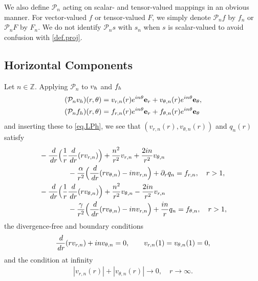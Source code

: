 \documentclass[11pt,a4paper]{article}
\numberwithin{equation}{section}
\newcommand{\Z}{\mathbb{Z}}
\newcommand{\dd}{\,{\rm d}}
\newcommand{\h}{{\rm h}}
\begin{document}
We also define ${\mathcal P}_n$ acting on scalar- and tensor-valued mappings in an obvious manner. For vector-valued $f$ or tensor-valued $F$, we simply denote ${\mathcal P}_n f$ by $f_n$ or ${\mathcal P}_n F$ by $F_n$. We do not identify ${\mathcal P}_n s$ with $s_n$ when $s$ is scalar-valued to avoid confusion with \eqref{def.proj}. 


\subsection{Horizontal Components}
\label{subsec.horiz}


Let $n\in\Z$. Applying ${\mathcal P}_n$ to $v_\h$ and $f_\h$
%
\begin{align*}
({\mathcal P}_n v_\h)(r,\theta)
&= v_{r,n}(r) e^{in\theta} {\bf e}_r 
+ v_{\theta,n}(r) e^{in\theta} {\bf e}_\theta, \\
({\mathcal P}_n f_\h)(r,\theta)
&= f_{r,n}(r) e^{in\theta} {\bf e}_r 
+ f_{\theta,n}(r) e^{in\theta} {\bf e}_\theta 
\end{align*}
%
and inserting these to \eqref{eq.LPh}, we see that $(v_{r,n}(r),v_{\theta,n}(r))$ and $q_n(r)$ satisfy 
%
\begin{align}
&\begin{aligned}\label{eq.LPh.polar.vr}
&-\frac{\dd}{\dd r} \Big(\frac1r\frac{\dd}{\dd r} (r v_{r,n})\Big)
+ \frac{n^2}{r^2} v_{r,n}
+ \frac{2in}{r^2} v_{\theta,n} \\
&\qquad\qquad
- \frac{\alpha}{r^2} \Big(\frac{\dd}{\dd r} (r v_{\theta,n}) - in v_{r,n}\Big)
+ \partial_r q_n 
= f_{r,n}, \quad r>1, \\
\end{aligned} \\
&\begin{aligned}\label{eq.LPh.polar.vtheta}
&-\frac{\dd}{\dd r} \Big(\frac1r\frac{\dd}{\dd r} (r v_{\theta,n})\Big) 
+ \frac{n^2}{r^2} v_{\theta,n}
- \frac{2in}{r^2} v_{r,n} \\
&\qquad\qquad
- \frac{\gamma}{r^2} \Big(\frac{\dd}{\dd r} (r v_{\theta,n}) - in v_{r,n}\Big)
+ \frac{i n}{r} q_n 
= f_{\theta,n}, \quad r>1, 
\end{aligned}
\end{align}
%
the divergence-free and boundary conditions 
%
\begin{align}\label{eq.LPh.polar.div-free.bdry}
\frac{\dd}{\dd r}(r v_{r,n}) + in v_{\theta,n}=0, 
\qquad v_{r,n}(1)=v_{\theta,n}(1)=0, 
\end{align}
%
and the condition at infinity
%
\begin{align}\label{eq.LPh.polar.spatial.infinity}
|v_{r,n}(r)| + |v_{\theta,n}(r)| \to 0, \quad r\to\infty. 
\end{align}
%
\end{document}
